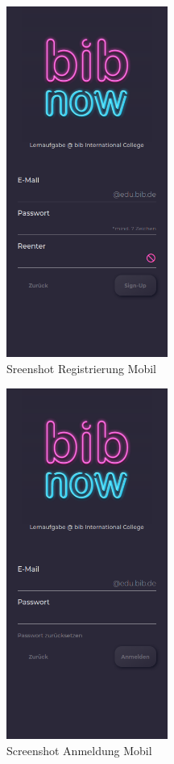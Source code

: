 \documentclass[12pt,titlepage]{article}
\begin{document}
\begin{figure}[hbt!]
\centering
\includegraphics[width=150pt]{screenshots/Screenshot_Mobil2.png}
\caption{Sreenshot Registrierung Mobil}
\end{figure}

\begin{figure}[hbt!]
\centering
\includegraphics[width=150pt]{screenshots/Screenshot_Mobil3.png}
\caption{Screenshot Anmeldung Mobil}
\end{figure}
\end{document}
